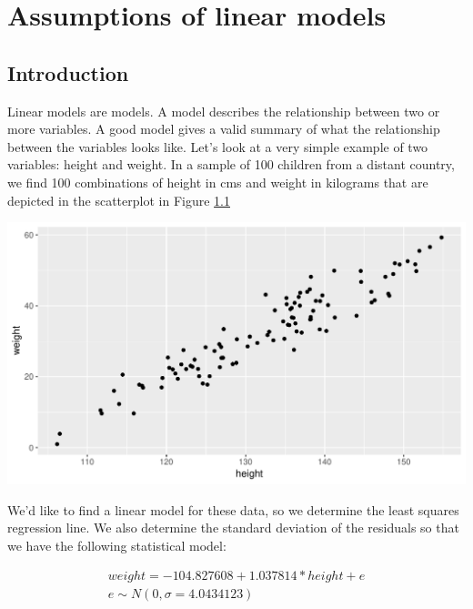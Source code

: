 \documentclass[]{report}\usepackage[]{graphicx}\usepackage[]{color}
\makeatletter
\def\maxwidth{ %
  \ifdim\Gin@nat@width>\linewidth
    \linewidth
  \else
    \Gin@nat@width
  \fi
}
\newenvironment{knitrout}{}{} %
\makeatother
\begin{document}
\chapter{Assumptions of linear models}\label{chap:assumptions}


\section{Introduction}
Linear models are models. A model describes the relationship between two or more variables. A good model gives a valid summary of what the relationship between the variables looks like. Let's look at a very simple example of two variables: height and weight. In a sample of 100 children from a distant country, we find 100 combinations of height in cms and weight in kilograms that are depicted in the scatterplot in Figure \ref{}

\begin{knitrout}
\color{fgcolor}

{\centering \includegraphics[width=\maxwidth]{figure/ass_1-1} 

}



\end{knitrout}

We'd like to find a linear model for these data, so we determine the least squares regression line. We also determine the standard deviation of the residuals so that we have the following statistical model:

\begin{eqnarray}
weight = -104.827608 + 1.037814* height + e \\
e \sim N(0, \sigma = 4.0434123) 
\end{eqnarray}
\end{document}

